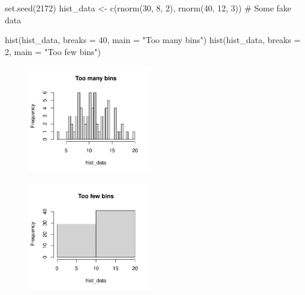 \documentclass[
  letterpaper,
]{report}
\newenvironment{Shaded}{\begin{snugshade}}{\end{snugshade}}
\newcommand{\AttributeTok}[1]{\textcolor[rgb]{0.40,0.45,0.13}{#1}}
\newcommand{\CommentTok}[1]{\textcolor[rgb]{0.37,0.37,0.37}{#1}}
\newcommand{\DecValTok}[1]{\textcolor[rgb]{0.68,0.00,0.00}{#1}}
\newcommand{\FunctionTok}[1]{\textcolor[rgb]{0.28,0.35,0.67}{#1}}
\newcommand{\NormalTok}[1]{\textcolor[rgb]{0.00,0.23,0.31}{#1}}
\newcommand{\OtherTok}[1]{\textcolor[rgb]{0.00,0.23,0.31}{#1}}
\newcommand{\StringTok}[1]{\textcolor[rgb]{0.13,0.47,0.30}{#1}}
\theoremstyle{definition}
\theoremstyle{definition}
\theoremstyle{remark}
\begin{document}
\begin{Shaded}
\begin{Highlighting}[]
\FunctionTok{set.seed}\NormalTok{(}\DecValTok{2172}\NormalTok{)}
\NormalTok{hist\_data }\OtherTok{\textless{}{-}} \FunctionTok{c}\NormalTok{(}\FunctionTok{rnorm}\NormalTok{(}\DecValTok{30}\NormalTok{, }\DecValTok{8}\NormalTok{, }\DecValTok{2}\NormalTok{), }\FunctionTok{rnorm}\NormalTok{(}\DecValTok{40}\NormalTok{, }\DecValTok{12}\NormalTok{, }\DecValTok{3}\NormalTok{))  }\CommentTok{\# Some fake data}

\FunctionTok{hist}\NormalTok{(hist\_data, }\AttributeTok{breaks =} \DecValTok{40}\NormalTok{, }\AttributeTok{main =} \StringTok{"Too many bins"}\NormalTok{)}
\FunctionTok{hist}\NormalTok{(hist\_data, }\AttributeTok{breaks =} \DecValTok{2}\NormalTok{,  }\AttributeTok{main =} \StringTok{"Too few bins"}\NormalTok{)}
\end{Highlighting}
\end{Shaded}

\begin{figure}[H]

{\centering \includegraphics[width=0.48\textwidth,height=\textheight]{sections/L02-dataviz_files/figure-pdf/hist-bins-1.pdf}

}

\end{figure}

\begin{figure}[H]

{\centering \includegraphics[width=0.48\textwidth,height=\textheight]{sections/L02-dataviz_files/figure-pdf/hist-bins-2.pdf}

}

\end{figure}
\end{document}

